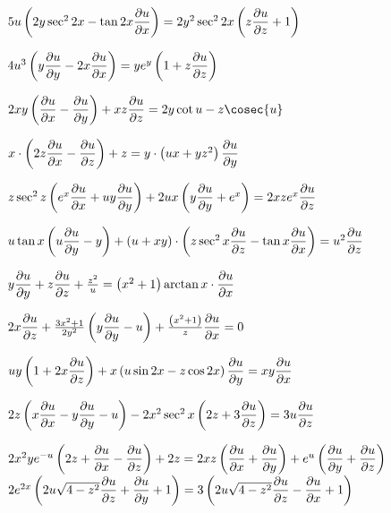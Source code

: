 \begin{enumtasks}
		\label{nonlinsys_quazilinear:dim3_part2}
		\item \( 5u \pares{2y \sec^2{2x} - \tan{2x} \dpart{u}{x}} = 2 y^2 \sec^2{2x} \pares{z\dpart{u}{z} + 1} \) 						%
		\item \( 4 u^3 \pares{ y \dpart{u}{y} - 2x \dpart{u}{x} } = y e^{y} \pares{1 + z\dpart{u}{z}} \)							%
		\item \( 2xy \pares{\dpart{u}{x} - \dpart{u}{y}} + xz \dpart{u}{z} = 2y \cot{u} - z \cosec{u} \)								%
		\item \( x \cdot \pares{ 2 z \dpart{u}{x} - \dpart{u}{z}} + z = y \cdot \pares{ux + y z^2} \dpart{u}{y}  \)						%
		\item \( z \sec^2{z} \pares{e^x \dpart{u}{x} + uy \dpart{u}{y}} + 2ux \pares{y \dpart{u}{y} + e^x} = 2xz e^x \dpart{u}{z} \)	%
		\item \( u \tan{x} \pares{u \dpart{u}{y} - y} + \pares{u + xy} \cdot \pares{z \sec^2{x} \dpart{u}{z} - \tan{x} \dpart{u}{x}} = u^2 \dpart{u}{z} \) %
		\item \( y \dpart{u}{y} + z \dpart{u}{z} + \frac{z^2}{u} = \pares{x^2 + 1} \arctan{x} \cdot \dpart{u}{x} \) 					%
		\item \( 2x \dpart{u}{z} + \frac{3x^2 + 1}{2y^2} \pares{y\dpart{u}{y} - u} + \frac{\pares{x^2 + 1}}{z} \dpart{u}{x} = 0 \)		%
		\item \( uy \pares{1 + 2x \dpart{u}{z}} + x \pares{u \sin{2x} - z \cos{2x}} \dpart{u}{y} = xy \dpart{u}{x} \)					%
		\item \( 2z \pares{x \dpart{u}{x} - y\dpart{u}{y} - u} - 2x^2 \sec^2{x} \pares{2z + 3 \dpart{u}{z}} = 3u \dpart{u}{z} \)		%
		
		\label{nonlinsys_quazilinear:dim3_hard}
		\itemstar \( 2 x^2 y e^{-u} \pares{2 z + \dpart{u}{x} - \dpart{u}{z}} + 2z = 2xz \pares{ \dpart{u}{x} + \dpart{u}{y} } + e^u \pares{\dpart{u}{y} + \dpart{u}{z}} \) %
		\itemstar \( 2e^{2x} \pares{2u \sqrt{4 - z^2} \dpart{u}{z} + \dpart{u}{y} + 1} = 3 \pares{2u \sqrt{4 - z^2} \dpart{u}{z} - \dpart{u}{x} + 1} \) %

	\end{enumtasks}